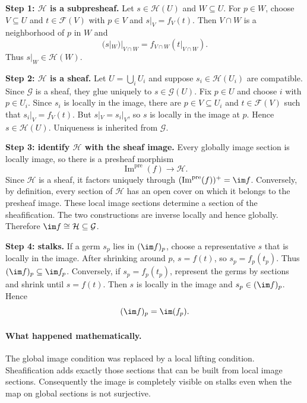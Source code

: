 \begin{solution}
\textbf{Step 1: $\mathcal H$ is a subpresheaf.}
Let $s\in\mathcal H(U)$ and $W\subseteq U$.  For $p\in W$, choose $V\subseteq U$ and
$t\in\mathcal F(V)$ with $p\in V$ and $s|_V=f_V(t)$.  Then $V\cap W$ is a neighborhood of
$p$ in $W$ and
\[
(s|_W)|_{V\cap W}=f_{V\cap W}(t|_{V\cap W}).
\]
Thus $s|_W\in\mathcal H(W)$.

\textbf{Step 2: $\mathcal H$ is a sheaf.}
Let $U=\bigcup_iU_i$ and suppose $s_i\in\mathcal H(U_i)$ are compatible.  Since
$\mathcal G$ is a sheaf, they glue uniquely to $s\in\mathcal G(U)$.  Fix $p\in U$ and
choose $i$ with $p\in U_i$.  Since $s_i$ is locally in the image, there are
$p\in V\subseteq U_i$ and $t\in\mathcal F(V)$ such that $s_i|_V=f_V(t)$.  But
$s|_V=s_i|_V$, so $s$ is locally in the image at $p$.  Hence $s\in\mathcal H(U)$.
Uniqueness is inherited from $\mathcal G$.

\textbf{Step 3: identify $\mathcal H$ with the sheaf image.}
Every globally image section is locally image, so there is a presheaf morphism
\[
\operatorname{Im}^{\mathrm{pre}}(f)\longrightarrow\mathcal H.
\]
Since $\mathcal H$ is a sheaf, it factors uniquely through
$(\operatorname{Im}^{\mathrm{pre}}(f))^+=\im f$.  Conversely, by definition, every section
of $\mathcal H$ has an open cover on which it belongs to the presheaf image.  These local
image sections determine a section of the sheafification.  The two constructions are inverse
locally and hence globally.  Therefore $\im f\cong\mathcal H\subseteq\mathcal G$.

\textbf{Step 4: stalks.}
If a germ $s_p$ lies in $(\im f)_p$, choose a representative $s$ that is locally in the
image.  After shrinking around $p$, $s=f(t)$, so $s_p=f_p(t_p)$.  Thus
$(\im f)_p\subseteq\im f_p$.  Conversely, if $s_p=f_p(t_p)$, represent the germs by
sections and shrink until $s=f(t)$.  Then $s$ is locally in the image and
$s_p\in(\im f)_p$.  Hence
\[
(\im f)_p=\im(f_p).
\]
\end{solution}

\paragraph{What happened mathematically.}
The global image condition was replaced by a local lifting condition.  Sheafification adds
exactly those sections that can be built from local image sections.  Consequently the image
is completely visible on stalks even when the map on global sections is not surjective.

